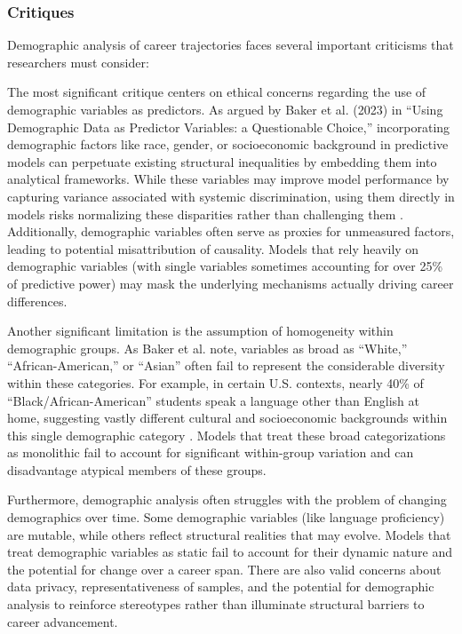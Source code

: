 \documentclass[../main.tex]{subfiles}
\begin{document}
\subsubsection{Critiques}

 Demographic analysis of career trajectories faces several important criticisms that researchers must consider:

 The most significant critique centers on ethical concerns regarding the use of demographic variables as predictors. As argued by Baker et al. (2023) in ``Using Demographic Data as Predictor Variables: a Questionable Choice,'' incorporating demographic factors like race, gender, or socioeconomic background in predictive models can perpetuate existing structural inequalities by embedding them into analytical frameworks. While these variables may improve model performance by capturing variance associated with systemic discrimination, using them directly in models risks normalizing these disparities rather than challenging them \citep{baker2023demographic}. Additionally, demographic variables often serve as proxies for unmeasured factors, leading to potential misattribution of causality. Models that rely heavily on demographic variables (with single variables sometimes accounting for over 25\% of predictive power) may mask the underlying mechanisms actually driving career differences.

 Another significant limitation is the assumption of homogeneity within demographic groups. As Baker et al. note, variables as broad as ``White,'' ``African-American,'' or ``Asian'' often fail to represent the considerable diversity within these categories. For example, in certain U.S. contexts, nearly 40\% of ``Black/African-American'' students speak a language other than English at home, suggesting vastly different cultural and socioeconomic backgrounds within this single demographic category \citep{baker2023demographic}. Models that treat these broad categorizations as monolithic fail to account for significant within-group variation and can disadvantage atypical members of these groups.

 Furthermore, demographic analysis often struggles with the problem of changing demographics over time. Some demographic variables (like language proficiency) are mutable, while others reflect structural realities that may evolve. Models that treat demographic variables as static fail to account for their dynamic nature and the potential for change over a career span. There are also valid concerns about data privacy, representativeness of samples, and the potential for demographic analysis to reinforce stereotypes rather than illuminate structural barriers to career advancement.
\end{document}
